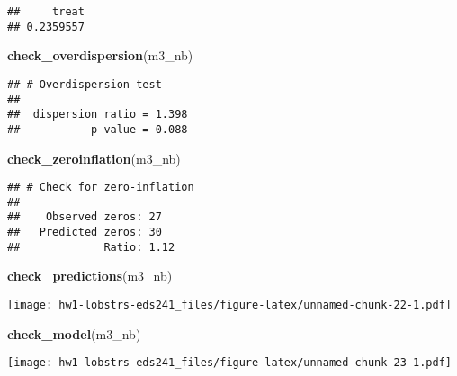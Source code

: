 \documentclass[
]{article}
\newenvironment{Shaded}{\begin{snugshade}}{\end{snugshade}}
\newcommand{\CommentTok}[1]{\textcolor[rgb]{0.56,0.35,0.01}{\textit{#1}}}
\newcommand{\DecValTok}[1]{\textcolor[rgb]{0.00,0.00,0.81}{#1}}
\newcommand{\FunctionTok}[1]{\textcolor[rgb]{0.13,0.29,0.53}{\textbf{#1}}}
\newcommand{\NormalTok}[1]{#1}
\newcommand{\SpecialCharTok}[1]{\textcolor[rgb]{0.81,0.36,0.00}{\textbf{#1}}}
\begin{document}
\begin{Shaded}
\end{Shaded}

\begin{verbatim}
##     treat 
## 0.2359557
\end{verbatim}

\begin{Shaded}
\begin{Highlighting}[]
\FunctionTok{check\_overdispersion}\NormalTok{(m3\_nb)}
\end{Highlighting}
\end{Shaded}

\begin{verbatim}
## # Overdispersion test
## 
##  dispersion ratio = 1.398
##           p-value = 0.088
\end{verbatim}

\begin{Shaded}
\begin{Highlighting}[]
\FunctionTok{check\_zeroinflation}\NormalTok{(m3\_nb)}
\end{Highlighting}
\end{Shaded}

\begin{verbatim}
## # Check for zero-inflation
## 
##    Observed zeros: 27
##   Predicted zeros: 30
##             Ratio: 1.12
\end{verbatim}

\begin{Shaded}
\begin{Highlighting}[]
\FunctionTok{check\_predictions}\NormalTok{(m3\_nb)}
\end{Highlighting}
\end{Shaded}

\texttt{[image: hw1-lobstrs-eds241\_files/figure-latex/unnamed-chunk-22-1.pdf]}

\begin{Shaded}
\begin{Highlighting}[]
\FunctionTok{check\_model}\NormalTok{(m3\_nb)}
\end{Highlighting}
\end{Shaded}

\texttt{[image: hw1-lobstrs-eds241\_files/figure-latex/unnamed-chunk-23-1.pdf]}
\end{document}
